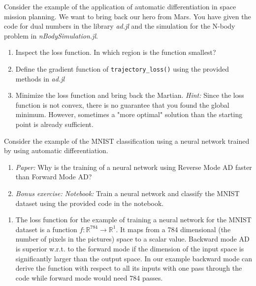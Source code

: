 \begin{exercise}[subtitle={Notebook}]

Consider the example of the application of automatic differentiation in space mission planning. We want to bring back our hero from Mars. You have given the code for dual numbers in the library \textit{ad.jl} and the simulation for the N-body problem in \textit{nBodySimulation.jl}. 

\begin{enumerate}[label=\emph{\alph*)}]
\item Inspect the loss function. In which region is the function smallest?
\item Define the gradient function of \texttt{trajectory\_loss()} using the provided methods in \textit{ad.jl}
\item Minimize the loss function and bring back the Martian. \textit{Hint:} Since the loss function is not convex, there is no guarantee that you found the global minimum. However, sometimes a "more optimal" solution than the starting point is already sufficient.
\end{enumerate}
\end{exercise}


\begin{exercise}[subtitle={Paper + Notebook}]

Consider the example of the MNIST classification using a neural network trained by using automatic differentiation.

\begin{enumerate}[label=\emph{\alph*)}]
\item \textit{Paper:} Why is the training of a neural network using Reverse Mode AD faster than Forward Mode AD?
\item \textit{Bonus exercise: Notebook:} Train a neural network and classify the MNIST dataset using the provided code in the notebook.
\end{enumerate}
\end{exercise}

\begin{solution}[print=true]
\begin{enumerate}[label=\emph{\alph*)}]
\item The loss function for the example of training a neural network for the MNIST dataset is a function $f: \mathbb{R}^{784} \rightarrow \mathbb{R}^1$. It maps from a 784 dimensional (the number of pixels in the pictures) space to a scalar value. Backward mode AD is superior w.r.t. to the forward mode if the dimension of the input space is significantly larger than the output space. In our example backward mode can derive the function with respect to all its inputs with one pass through the code while forward mode would need 784 passes.
\end{enumerate}

\end{solution}


